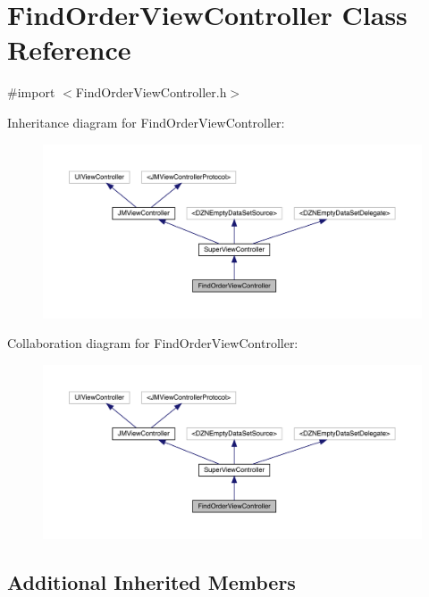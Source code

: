 \hypertarget{interface_find_order_view_controller}{}\section{Find\+Order\+View\+Controller Class Reference}
\label{interface_find_order_view_controller}


{\ttfamily \#import $<$Find\+Order\+View\+Controller.\+h$>$}



Inheritance diagram for Find\+Order\+View\+Controller\+:\nopagebreak
\begin{figure}[H]
\begin{center}
\leavevmode
\includegraphics[width=350pt]{interface_find_order_view_controller__inherit__graph}
\end{center}
\end{figure}


Collaboration diagram for Find\+Order\+View\+Controller\+:\nopagebreak
\begin{figure}[H]
\begin{center}
\leavevmode
\includegraphics[width=350pt]{interface_find_order_view_controller__coll__graph}
\end{center}
\end{figure}
\subsection*{Additional Inherited Members}


